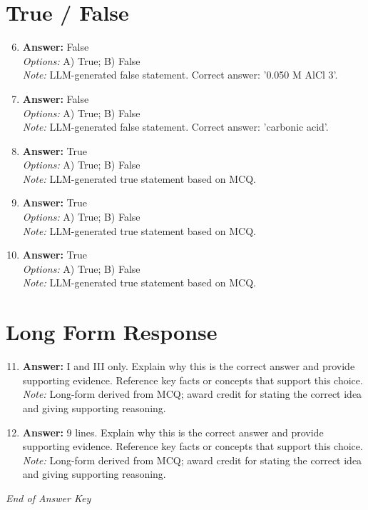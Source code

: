\documentclass[12pt]{article}
\begin{document}
\section*{True / False}
\begin{enumerate}[label=\arabic*.]
\setcounter{enumi}{5}
\item \textbf{Answer:} False
\\ \textit{Options:} A) True; B) False
\\ \textit{Note:} LLM-generated false statement. Correct answer: '0.050 M AlCl 3'.
\item \textbf{Answer:} False
\\ \textit{Options:} A) True; B) False
\\ \textit{Note:} LLM-generated false statement. Correct answer: 'carbonic acid'.
\item \textbf{Answer:} True
\\ \textit{Options:} A) True; B) False
\\ \textit{Note:} LLM-generated true statement based on MCQ.
\item \textbf{Answer:} True
\\ \textit{Options:} A) True; B) False
\\ \textit{Note:} LLM-generated true statement based on MCQ.
\item \textbf{Answer:} True
\\ \textit{Options:} A) True; B) False
\\ \textit{Note:} LLM-generated true statement based on MCQ.
\end{enumerate}

\section*{Long Form Response}
\begin{enumerate}[label=\arabic*.]
\setcounter{enumi}{10}
\item \textbf{Answer:} I and III only. Explain why this is the correct answer and provide supporting evidence. Reference key facts or concepts that support this choice.
\\ \textit{Note:} Long-form derived from MCQ; award credit for stating the correct idea and giving supporting reasoning.
\item \textbf{Answer:} 9 lines. Explain why this is the correct answer and provide supporting evidence. Reference key facts or concepts that support this choice.
\\ \textit{Note:} Long-form derived from MCQ; award credit for stating the correct idea and giving supporting reasoning.
\end{enumerate}

\vfill
\noindent\textit{End of Answer Key}
\end{document}
